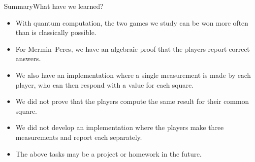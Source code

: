 \begin{frame}{Summary}{What have we learned?}
\begin{itemize}[<+->]
    \item With quantum computation, the two games we study can be won more often than is classically possible.
    \item For Mermin--Peres, we have an algebraic proof that the players report correct answers.
    \item We also have an implementation where a single measurement is made by each player, who can then respond with a value for each square.
    \item We did not prove that the players compute the same result for their common square.
    \item We did not develop an implementation where the players make three measurements and report each separately.
    \item The above tasks may be a project or homework in the future.
\end{itemize}
\end{frame}

